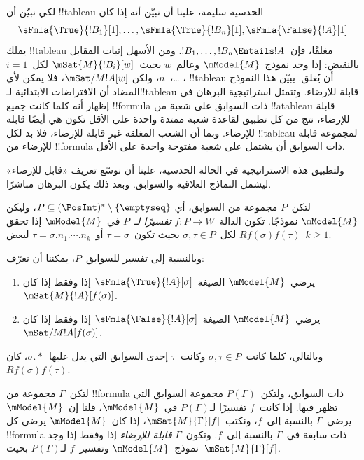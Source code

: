\documentclass[../../../include/open-logic-section]{subfiles}
\begin{document}


\begin{explain}
  لكي نبيّن أن !!{tableau} الحدسية سليمة، علينا أن نبيّن أنه إذا كان
  \[
  \sFmla{\True}{!B_1}[1], \dots, \sFmla{\True}{!B_n}[1], \sFmla{\False}{!A}[1]
  \]
  يملك !!{tableau} مغلقًا، فإن~$!B_1, \dots, !B_n \Entails !A$.
  ومن الأسهل إثبات المقابل بالنقيض: إذا وجد نموذج~$\mModel{M}$ وعالم~$w$
  بحيث~$\mSat{M}{!B_i}[w]$ لكل~$i=1$، \dots،~$n$، ولكن
  $\mSat/{M}{!A}[w]$، فلا يمكن لأي !!{tableau} أن يُغلق. يبيّن هذا
  النموذج المضاد أن الافتراضات الابتدائية لـ!!{tableau} قابلة للإرضاء.
  وتتمثل استراتيجية البرهان في إظهار أنه كلما كانت جميع !!{formula}
  ذات السوابق على شعبة من !!a{tableau} قابلة للإرضاء، نتج من كل تطبيق
  لقاعدة شعبة ممتدة واحدة على الأقل تكون هي أيضًا قابلة للإرضاء. وبما أن
  الشعب المغلقة غير قابلة للإرضاء، فلا بد لكل !!{tableau} لمجموعة قابلة
  للإرضاء من !!{formula} ذات السوابق أن يشتمل على شعبة مفتوحة واحدة
  على الأقل.

  ولتطبيق هذه الاستراتيجية في الحالة الحدسية، علينا أن نوسّع تعريف
  «قابل للإرضاء» ليشمل النماذج العلاقية والسوابق. وبعد ذلك يكون البرهان
  مباشرًا.
\end{explain}

\begin{defn}
  لتكن~$P$ مجموعة من السوابق، أي
  $P \subseteq (\PosInt)^* \setminus \{\emptyseq\}$، وليكن
  $\mModel{M}$ نموذجًا. تكون الدالة~$f\colon P \to W$
  \emph{تفسيرًا لـ}~$P$ في~$\mModel{M}$ إذا تحقق
  $Rf(\sigma)f(\tau)$ لكل~$\sigma,\tau\in P$ بحيث تكون~$\tau=\sigma$
  أو~$\tau=\sigma.n_1.\cdots.n_k$ لبعض~$k\geq 1$.

  وبالنسبة إلى تفسير للسوابق~$P$، يمكننا أن نعرّف:
  \begin{enumerate}
  \item يرضي~$\mModel{M}$ الصيغة~$\sFmla{\True}{!A}[\sigma]$ إذا وفقط
    إذا كان~$\mSat{M}{!A}[f(\sigma)]$.
  \item يرضي~$\mModel{M}$ الصيغة~$\sFmla{\False}{!A}[\sigma]$ إذا وفقط
    إذا كان~$\mSat/{M}{!A}[f(\sigma)]$.
  \end{enumerate}
\end{defn}

وبالتالي، كلما كانت~$\sigma,\tau\in P$ وكانت~$\tau$ إحدى السوابق التي
يدل عليها~$\sigma.{*}$، كان~$Rf(\sigma)f(\tau)$.

\begin{defn}
  لتكن~$\Gamma$ مجموعة من !!{formula} ذات السوابق، ولتكن~$P(\Gamma)$
  مجموعة السوابق التي تظهر فيها. إذا كانت~$f$ تفسيرًا لـ$P(\Gamma)$
  في~$\mModel{M}$، قلنا إن~$\mModel{M}$ يرضي~$\Gamma$ بالنسبة إلى~$f$،
  ونكتب~$\mSat{M}{\Gamma}[f]$، إذا كان~$\mModel{M}$ يرضي كل
  !!{formula} ذات سابقة في~$\Gamma$ بالنسبة إلى~$f$. وتكون~$\Gamma$
  \emph{قابلة للإرضاء} إذا وفقط إذا وجد نموذج~$\mModel{M}$ وتفسير~$f$
  لـ$P(\Gamma)$ بحيث~$\mSat{M}{\Gamma}[f]$.
\end{defn}
\end{document}
